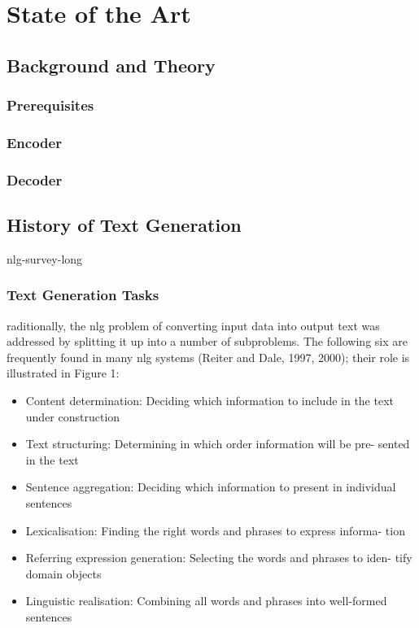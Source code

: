\chapter{State of the Art}\label{ch:sota}

\section{Background and Theory}
\subsection{Prerequisites}
\subsection{Encoder}
\subsection{Decoder}


\section{History of Text Generation}\label{ss:history}

nlg-survey-long

\subsection{Text Generation Tasks}
raditionally, the nlg problem of converting input data into output text was addressed by splitting it up into a number of subproblems. The following six are frequently found in many nlg systems (Reiter and Dale, 1997, 2000); their role is illustrated in Figure 1:
\begin{itemize}
	\item Content determination: Deciding which information to include in the text under construction
	\item Text structuring: Determining in which order information will be pre- sented in the text
	\item Sentence aggregation: Deciding which information to present in individual sentences
	\item Lexicalisation: Finding the right words and phrases to express informa- tion
	\item Referring expression generation: Selecting the words and phrases to iden- tify domain objects
	\item Linguistic realisation: Combining all words and phrases into well-formed sentences
\end{itemize}

